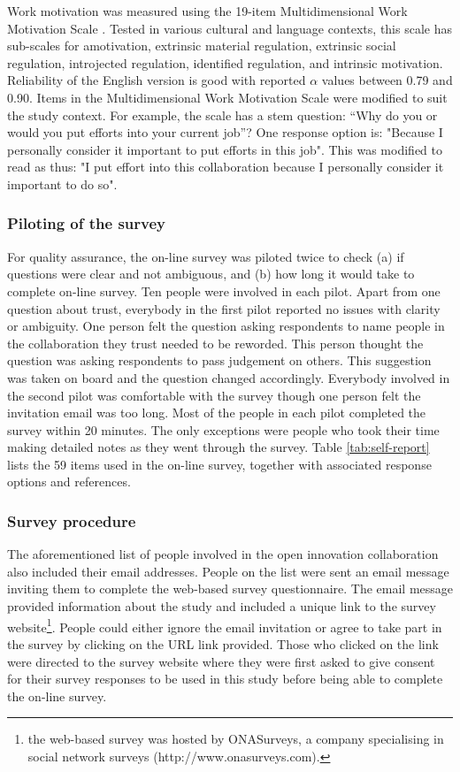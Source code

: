 Work motivation was measured using the 19-item Multidimensional Work Motivation Scale \citep{gagne2015multidimensional}. Tested in various cultural and language contexts, this scale has sub-scales for amotivation, extrinsic material regulation, extrinsic social regulation, introjected regulation, identified regulation, and intrinsic motivation. Reliability of the English version is good with reported $\alpha$ values between 0.79 and 0.90. Items in the Multidimensional Work Motivation Scale were modified to suit the study context. For example, the scale has a stem question: “Why do you or would you put efforts into your current job”? One response option is: "Because I personally consider it important to put efforts in this job". This was modified to read as thus: "I put effort into this collaboration because I personally consider it important to do so". \medskip

\subsubsection{Piloting of the survey}

For quality assurance, the on-line survey was piloted twice to check (a) if questions were clear and not ambiguous, and (b) how long it would take to complete on-line survey. Ten people were involved in each pilot. Apart from one question about trust, everybody in the first pilot reported no issues with clarity or ambiguity. One person felt the question asking respondents to name people in the collaboration they trust needed to be reworded. This person thought the question was asking respondents to pass judgement on others. This suggestion was taken on board and the question changed accordingly. Everybody involved in the second pilot was comfortable with the survey though one person felt the invitation email was too long. Most of the people in each pilot completed the survey within 20 minutes. The only exceptions were people who took their time making detailed notes as they went through the survey. Table \ref{tab:self-report} lists the 59 items used in the on-line survey, together with associated response options and references.\medskip  


\subsubsection{Survey procedure}

The aforementioned list of people involved in the open innovation collaboration also included their email addresses. People on the list were sent an email message inviting them to complete the web-based survey questionnaire. The email message provided information about the study and included a unique link to the survey website\footnote{the web-based survey was hosted by ONASurveys, a company specialising in social network surveys (http://www.onasurveys.com).}. People could either ignore the email invitation or agree to take part in the survey by clicking on the URL link provided. Those who clicked on the link were directed to the survey website where they were first asked to give consent for their survey responses to be used in this study before being able to complete the on-line survey.\medskip



